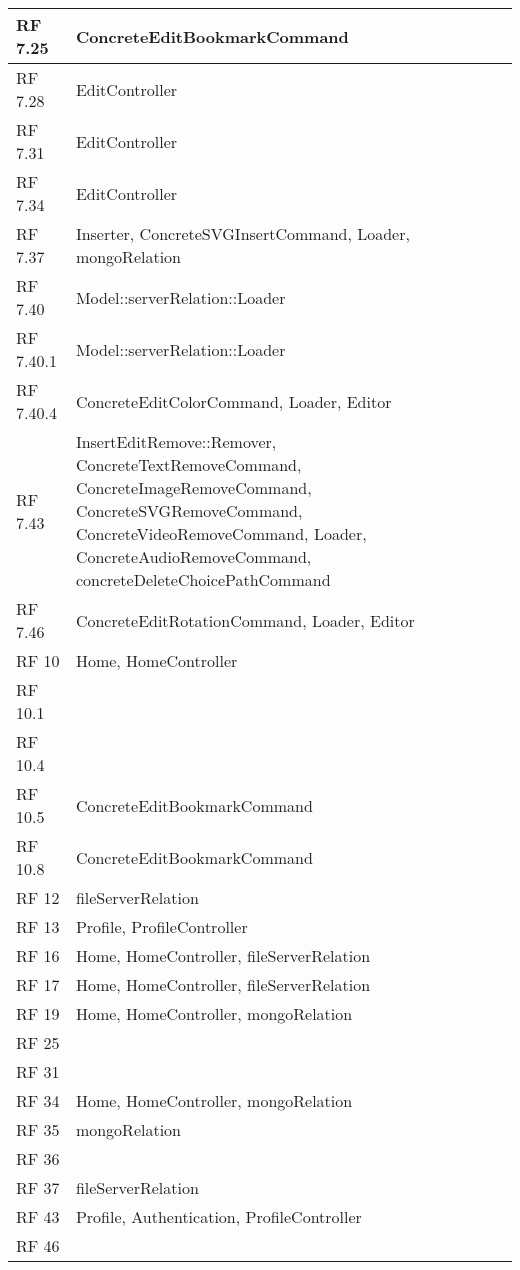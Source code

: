 {\begin{center}
\begin{longtable} [c]{| p{2cm} | p{13cm} |}
	 \hline 
	RF 7.25 & ConcreteEditBookmarkCommand\\ 
	 \hline 
	RF 7.28 & EditController\\ 
	 \hline 
	RF 7.31 & EditController\\ 
	 \hline 
	RF 7.34 & EditController\\ 
	 \hline 
	RF 7.37 & Inserter, ConcreteSVGInsertCommand, Loader, mongoRelation\\ 
	 \hline 
	RF 7.40 & Model::\-serverRelation::\-Loader\\ 
	 \hline 
	RF 7.40.1 & Model::\-serverRelation::\-Loader\\ 
	 \hline 
	RF 7.40.4 & ConcreteEditColorCommand, Loader, Editor\\ 
	 \hline 
	RF 7.43 & InsertEditRemove::\-Remover, ConcreteTextRemoveCommand, ConcreteImageRemoveCommand, ConcreteSVGRemoveCommand, ConcreteVideoRemoveCommand, Loader, ConcreteAudioRemoveCommand, concreteDeleteChoicePathCommand\\ 
	 \hline 
	RF 7.46 & ConcreteEditRotationCommand, Loader, Editor\\ 
	 \hline 
	RF 10 & Home, HomeController\\ 
	 \hline 
	RF 10.1 & \\ 
	 \hline 
	RF 10.4 & \\ 
	 \hline 
	RF 10.5 & ConcreteEditBookmarkCommand\\ 
	 \hline 
	RF 10.8 & ConcreteEditBookmarkCommand\\ 
	 \hline 
	RF 12 & fileServerRelation\\ 
	 \hline 
	RF 13 & Profile, ProfileController\\ 
	 \hline 
	RF 16 & Home, HomeController, fileServerRelation\\ 
	 \hline 
	RF 17 & Home, HomeController, fileServerRelation\\ 
	 \hline 
	RF 19 & Home, HomeController, mongoRelation\\ 
	 \hline 
	RF 25 & \\ 
	 \hline 
	RF 31 & \\ 
	 \hline 
	RF 34 & Home, HomeController, mongoRelation\\ 
	 \hline 
	RF 35 & mongoRelation\\ 
	 \hline 
	RF 36 & \\ 
	 \hline 
	RF 37 & fileServerRelation\\ 
	 \hline 
	RF 43 & Profile, Authentication, ProfileController\\ 
	 \hline 
	RF 46 & \\ 

\end{longtable}
\end{center}}
